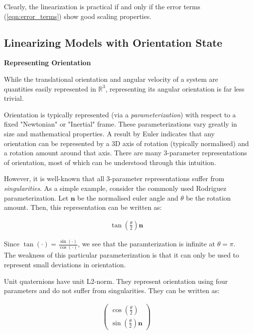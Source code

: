 \documentclass{article}
\begin{document}
Clearly, the linearization is practical if and only if the error terms (\ref{eqn:error_terms}) show good scaling properties.

\subsection{Linearizing Models with Orientation State}

\begin{center}
    \textbf{Representing Orientation}
\end{center}

While the translational orientation and angular velocity of a system are quantities easily represented in $\mathbb{R}^3$, representing its angular orientation is far less trivial.

Orientation is typically represented (via a \textit{parameterization}) with respect to a fixed "Newtonian" or "Inertial" frame. These parameterizations vary greatly in size and mathematical properties. A result by Euler indicates that any orientation can be represented by a 3D axis of rotation (typically normalised) and a rotation amount around that axis. There are many 3-parameter representations of orientation, most of which can be understood through this intuition.

However, it is well-known that all 3-parameter representations suffer from \textit{singularities}. As a simple example, consider the commonly used Rodriguez parameterization. Let $\pmb{n}$ be the normalised euler angle and $\theta$ be the rotation amount. Then, this representation can be written as:

\begin{gather}
    \tan\left(\frac{\theta}{2}\right)\pmb{n} \label{eqn:rp}
\end{gather}

Since $\tan(\cdot) = \frac{\sin(\cdot)}{\cos(\cdot)}$, we see that the paramterization is infinite at $\theta = \pi$. The weakness of this particular parameterization is that it can only be used to represent small deviations in orientation.

Unit quaternions have unit L2-norm. They represent orientation using four parameters and do not suffer from singularities. They can be written as:

\begin{gather}
    \left(
    \begin{array}{c} \cos(\frac{\theta}{2}) \\
        \sin(\frac{\theta}{2}) \pmb{n}\end{array}
    \right)
\end{gather}
\end{document}
